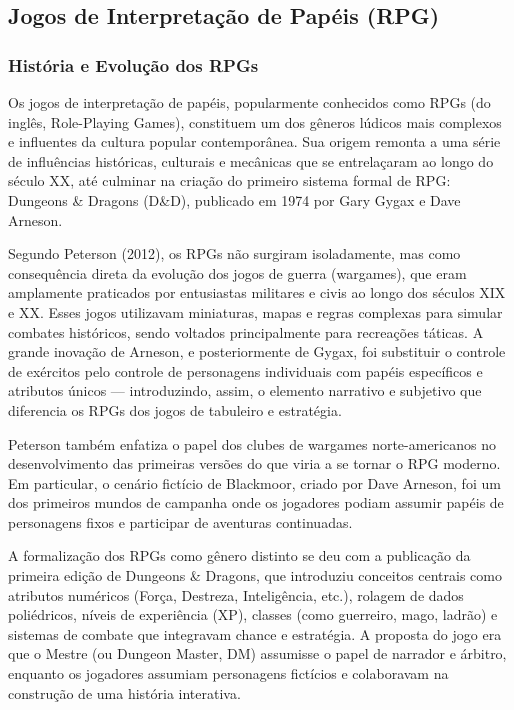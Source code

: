 \subsection{Jogos de Interpretação de Papéis (RPG)}

\subsubsection{História e Evolução dos RPGs}
Os jogos de interpretação de papéis, popularmente conhecidos como RPGs (do inglês, Role-Playing Games), constituem 
um dos gêneros lúdicos mais complexos e influentes da cultura popular contemporânea. Sua origem remonta a uma 
série de influências históricas, culturais e mecânicas que se entrelaçaram ao longo do século XX, até culminar
 na criação do primeiro sistema formal de RPG: Dungeons \& Dragons (D\&D), publicado em 1974 por Gary Gygax e 
 Dave Arneson.

Segundo Peterson (2012), os RPGs não surgiram isoladamente, mas como consequência direta da evolução dos jogos 
de guerra (wargames), que eram amplamente praticados por entusiastas militares e civis ao longo dos séculos 
XIX e XX. Esses jogos utilizavam miniaturas, mapas e regras complexas para simular combates históricos, sendo 
voltados principalmente para recreações táticas. A grande inovação de Arneson, e posteriormente de Gygax, foi 
substituir o controle de exércitos pelo controle de personagens individuais com papéis específicos e atributos 
únicos — introduzindo, assim, o elemento narrativo e subjetivo que diferencia os RPGs dos jogos de tabuleiro e 
estratégia.

Peterson também enfatiza o papel dos clubes de wargames norte-americanos no desenvolvimento das primeiras 
versões do que viria a se tornar o RPG moderno. Em particular, o cenário fictício de Blackmoor, criado por 
Dave Arneson, foi um dos primeiros mundos de campanha onde os jogadores podiam assumir papéis de personagens 
fixos e participar de aventuras continuadas.

A formalização dos RPGs como gênero distinto se deu com a publicação da primeira edição de Dungeons \& Dragons, 
que introduziu conceitos centrais como atributos numéricos (Força, Destreza, Inteligência, etc.), rolagem de 
dados poliédricos, níveis de experiência (XP), classes (como guerreiro, mago, ladrão) e sistemas de combate que 
integravam chance e estratégia. A proposta do jogo era que o Mestre (ou Dungeon Master, DM) assumisse o papel de 
narrador e árbitro, enquanto os jogadores assumiam personagens fictícios e colaboravam na construção de uma 
história interativa.

